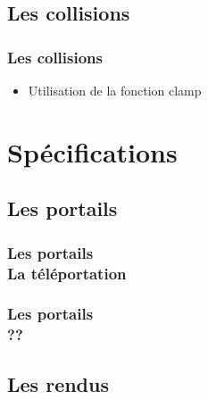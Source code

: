 \documentclass{beamer}
\begin{document}
\subsection{Les collisions}

\begin{frame}
    \frametitle{Les collisions}
    \begin{block}{}
        \begin{itemize}
            \item Utilisation de la fonction clamp
        \end{itemize}
    \end{block}
\end{frame}

\section{Spécifications}
\subsection{Les portails}

\begin{frame}
    \frametitle{Les portails \\
                \small La téléportation}
    \begin{block}{}
        
    \end{block}
\end{frame}

\begin{frame}
    \frametitle{Les portails \\
                \small ??}
    \begin{block}{}
        
    \end{block}
\end{frame}

\subsection{Les rendus}
\end{document}
